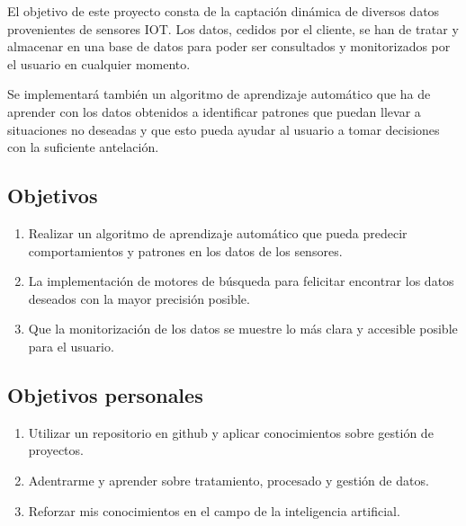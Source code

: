 
El objetivo de este proyecto consta de la captación dinámica de diversos datos provenientes de sensores IOT. Los datos, cedidos por el cliente, se han de tratar y almacenar en una base de datos para poder ser consultados y monitorizados por el usuario en cualquier momento. 

Se implementará también un algoritmo de aprendizaje automático que ha de aprender con los datos obtenidos a identificar patrones que puedan llevar a situaciones no deseadas y que esto pueda ayudar al usuario a tomar decisiones con la suficiente antelación.

\subsection{Objetivos}

\begin{enumerate}
    \item Realizar un algoritmo de aprendizaje automático que pueda predecir comportamientos y patrones en los datos de los sensores.
    \item La implementación de motores de búsqueda para felicitar encontrar los datos deseados con la mayor precisión posible.
    \item Que la monitorización de los datos se muestre lo más clara y accesible posible para el usuario.
\end{enumerate}


\subsection{Objetivos personales}

\begin{enumerate}
    \item Utilizar un repositorio en github y aplicar conocimientos sobre gestión de proyectos.
    \item Adentrarme y aprender sobre tratamiento, procesado y gestión de datos.
    \item Reforzar mis conocimientos en el campo de la inteligencia artificial.
\end{enumerate}
